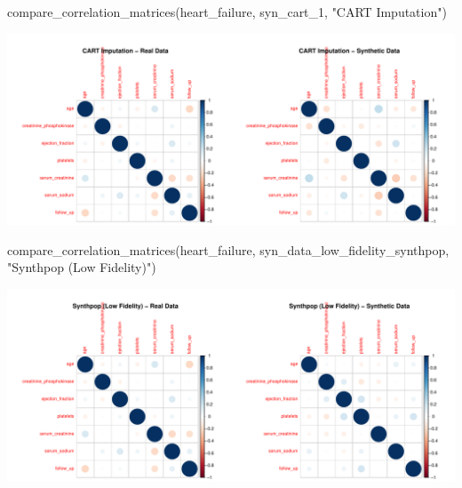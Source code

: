 \documentclass[
  letterpaper,
  DIV=11,
  numbers=noendperiod]{scrartcl}
\newenvironment{Shaded}{\begin{snugshade}}{\end{snugshade}}
\newcommand{\FunctionTok}[1]{\textcolor[rgb]{0.28,0.35,0.67}{#1}}
\newcommand{\NormalTok}[1]{\textcolor[rgb]{0.00,0.23,0.31}{#1}}
\newcommand{\StringTok}[1]{\textcolor[rgb]{0.13,0.47,0.30}{#1}}
\begin{document}
\begin{Shaded}
\begin{Highlighting}[]
\FunctionTok{compare\_correlation\_matrices}\NormalTok{(heart\_failure, syn\_cart\_1, }\StringTok{"CART Imputation"}\NormalTok{)}
\end{Highlighting}
\end{Shaded}

\begin{center}
\includegraphics[width=1\linewidth,height=\textheight,keepaspectratio]{heart_failure_synthetic_data_project_files/figure-pdf/Correlation Matrices Comparison using Corrplot-2.pdf}
\end{center}

\begin{Shaded}
\begin{Highlighting}[]
\FunctionTok{compare\_correlation\_matrices}\NormalTok{(heart\_failure, syn\_data\_low\_fidelity\_synthpop, }\StringTok{"Synthpop (Low Fidelity)"}\NormalTok{)}
\end{Highlighting}
\end{Shaded}

\begin{center}
\includegraphics[width=1\linewidth,height=\textheight,keepaspectratio]{heart_failure_synthetic_data_project_files/figure-pdf/Correlation Matrices Comparison using Corrplot-3.pdf}
\end{center}
\end{document}
